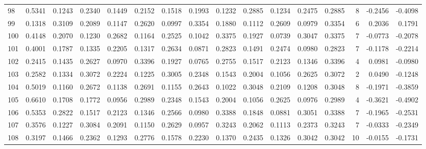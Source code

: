 \begin{tabular}{lrrrrrrrrrrrrrrr}
98  &      0.5341 &  0.1243 &  0.2340 &  0.1449 &  0.2152 &  0.1518 &  0.1993 &  0.1232 &  0.2885 &  0.1234 &   0.2475 &     0.2885 &      8 &                   -0.2456 &                    -0.4098 \\
99  &      0.1318 &  0.3109 &  0.2089 &  0.1147 &  0.2620 &  0.0997 &  0.3354 &  0.1880 &  0.1112 &  0.2609 &   0.0979 &     0.3354 &      6 &                    0.2036 &                     0.1791 \\
100 &      0.4148 &  0.2070 &  0.1230 &  0.2682 &  0.1164 &  0.2525 &  0.1042 &  0.3375 &  0.1927 &  0.0739 &   0.3047 &     0.3375 &      7 &                   -0.0773 &                    -0.2078 \\
101 &      0.4001 &  0.1787 &  0.1335 &  0.2205 &  0.1317 &  0.2634 &  0.0871 &  0.2823 &  0.1491 &  0.2474 &   0.0980 &     0.2823 &      7 &                   -0.1178 &                    -0.2214 \\
102 &      0.2415 &  0.1435 &  0.2627 &  0.0970 &  0.3396 &  0.1927 &  0.0765 &  0.2755 &  0.1517 &  0.2123 &   0.1346 &     0.3396 &      4 &                    0.0981 &                    -0.0980 \\
103 &      0.2582 &  0.1334 &  0.3072 &  0.2224 &  0.1225 &  0.3005 &  0.2348 &  0.1543 &  0.2004 &  0.1056 &   0.2625 &     0.3072 &      2 &                    0.0490 &                    -0.1248 \\
104 &      0.5019 &  0.1160 &  0.2672 &  0.1138 &  0.2691 &  0.1155 &  0.2643 &  0.1022 &  0.3048 &  0.2109 &   0.1208 &     0.3048 &      8 &                   -0.1971 &                    -0.3859 \\
105 &      0.6610 &  0.1708 &  0.1772 &  0.0956 &  0.2989 &  0.2348 &  0.1543 &  0.2004 &  0.1056 &  0.2625 &   0.0976 &     0.2989 &      4 &                   -0.3621 &                    -0.4902 \\
106 &      0.5353 &  0.2822 &  0.1517 &  0.2123 &  0.1346 &  0.2566 &  0.0980 &  0.3388 &  0.1848 &  0.0881 &   0.3051 &     0.3388 &      7 &                   -0.1965 &                    -0.2531 \\
107 &      0.3576 &  0.1227 &  0.3084 &  0.2091 &  0.1150 &  0.2629 &  0.0957 &  0.3243 &  0.2062 &  0.1113 &   0.2373 &     0.3243 &      7 &                   -0.0333 &                    -0.2349 \\
108 &      0.3197 &  0.1466 &  0.2362 &  0.1293 &  0.2776 &  0.1578 &  0.2230 &  0.1370 &  0.2435 &  0.1326 &   0.3042 &     0.3042 &     10 &                   -0.0155 &                    -0.1731 \\

\end{tabular}
